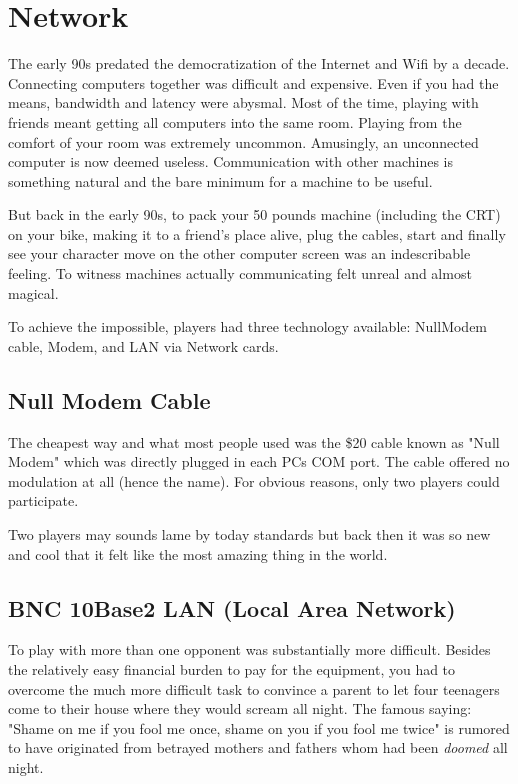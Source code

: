 \vspace{-10pt}
\section{Network}
The early 90s predated the democratization of the Internet and Wifi by a decade. Connecting computers together was difficult and expensive. Even if you had the means, bandwidth and latency were abysmal. Most of the time, playing with friends meant getting all computers into the same room. Playing from the comfort of your room was extremely uncommon. Amusingly, an unconnected computer is now deemed useless. Communication with other machines is something natural and the bare minimum for a machine to be useful.\\
\par
 But back in the early 90s, to pack your 50 pounds machine (including the CRT) on your bike, making it to a friend's place alive, plug the cables, start \doom{} and finally see your character move on the other computer screen was an indescribable feeling. To witness machines actually communicating felt unreal and almost magical.\\
\par 
To achieve the impossible, players had three technology available: NullModem cable, Modem, and LAN via Network cards.









\subsection{Null Modem Cable}
The cheapest way and what most people used was the \$20 cable known as "Null Modem" which was directly plugged in each PCs COM port. The cable offered no modulation at all (hence the name). For obvious reasons, only two players could participate.\\
\par 
{}
\par
 Two players may sounds lame by today standards but back then it was so new and cool that it felt like the most amazing thing in the world.







\subsection{BNC 10Base2 LAN (Local Area Network)}
To play with more than one opponent was substantially more difficult. Besides the relatively easy financial burden to pay for the equipment, you had to overcome the much more difficult task to convince a parent to let four teenagers come to their house where they would scream all night. The famous saying: "Shame on me if you fool me once, shame on you if you fool me twice" is rumored to have originated from betrayed mothers and fathers whom had been \textit{doomed} all night.\\
\par



